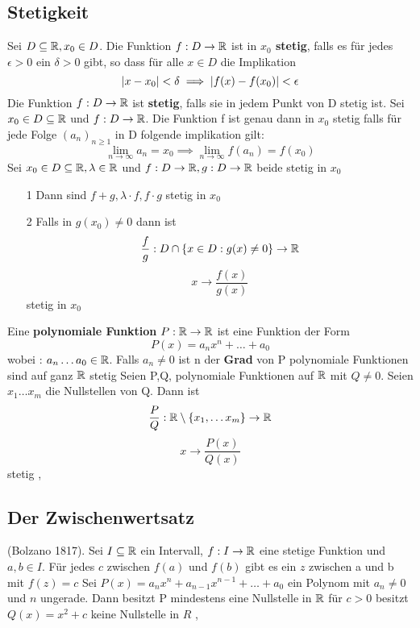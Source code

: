 \subsection{Stetigkeit}
 Sei \(D \subseteq \mathbb{R}, x_0 \in D\). Die Funktion \(f: D \rightarrow \mathbb{R} \) ist in \textbf{\(x_0\) stetig}, falls es für jedes \(\epsilon > 0 \) ein \(\delta > 0\) gibt, so dass für alle \(x \in D \) die Implikation
\[ \left\lvert x - x_0 \right\rvert < \delta \implies \left\lvert f(x) - f(x_0) \right\rvert < \epsilon\]
 Die Funktion \(f : D \rightarrow \mathbb{R}\) ist \textbf{stetig}, falls sie in jedem Punkt von D stetig ist. \newline
{} Sei \(x_0 \in D \subseteq \mathbb{R} \) und \(f: D \rightarrow \mathbb{R} \). Die Funktion f ist genau dann in \(x_0\) stetig falls für jede Folge \((a_n)_{n \geq 1}\) in D folgende implikation gilt:
\[\lim\limits_{n \rightarrow \infty} a_n = x_0 \implies \lim\limits_{n \rightarrow \infty} f(a_n) = f(x_0)\]
 Sei \(x_0 \in D \subseteq \mathbb{R}, \lambda \in \mathbb{R} \) und \(f : D \rightarrow \mathbb{R}, g: D \rightarrow \mathbb{R}\) beide stetig in \(x_0\)
\begin{enumerate}
    \item [1] Dann sind \(f+g, \lambda \cdot f, f \cdot g\) stetig in \(x_0\)
    \item [2] Falls in \(g(x_0) \neq 0\) dann ist
    \[ \frac{f}{g} : D \cap \{x \in D : g(x) \neq 0\} \rightarrow \mathbb{R}\]
    \[x \rightarrow \frac{f(x)}{g(x)}\] stetig in \(x_0\)
\end{enumerate}
 Eine \textbf{polynomiale Funktion} \(P: \mathbb{R} \rightarrow \mathbb{R}\) ist eine Funktion der Form
\[P(x) = a_nx^n + \dots + a_0\]
wobei : \(a_n \dots a_0 \in \mathbb{R}\). Falls \(a_n \neq 0\) ist n der \textbf{Grad} von P \newline
{} polynomiale Funktionen sind auf ganz \(\mathbb{R}\) stetig \newline
{} Seien P,Q, polynomiale Funktionen auf \(\mathbb{R}\) mit \(Q \neq 0\). Seien \(x_1 \dots x_m\) die Nullstellen von Q. Dann ist
\[\frac{P}{Q} : \mathbb{R} \setminus \{x_1, \dots x_m\} \rightarrow \mathbb{R} \]
\[x \rightarrow \frac{P(x)}{Q(x)}\] stetig
\sep
\subsection{Der Zwischenwertsatz}
 (Bolzano 1817). Sei \(I \subseteq \mathbb{R} \) ein Intervall, \(f : I \rightarrow \mathbb{R} \) eine stetige Funktion und \(a,b \in I\). Für jedes \(c\) zwischen \(f(a)\) und \(f(b)\) gibt es ein \(z\) zwischen a und b mit \(f(z) = c\) \newline
{} Sei \(P(x) = a_nx^n + a_{n-1}x^{n-1} + \dots + a_0\) ein Polynom mit \(a_n \neq 0\) und \(n\) ungerade. Dann besitzt P mindestens eine Nullstelle in \(\mathbb{R}\)
 für \(c > 0\) besitzt \(Q(x) = x^2 + c\) keine Nullstelle in \(R\) \newline
\sep
